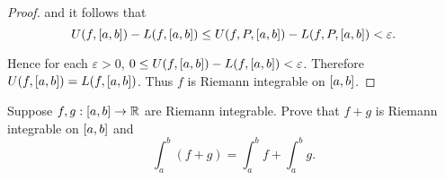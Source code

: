 \begin{proof}
    and it follows that
    \[
        U(f, \left[{a, b}\right]) - L(f, \left[{a, b}\right]) \leq U(f, P, \left[{a, b}\right]) - L(f, P, \left[{a, b}\right]) < \varepsilon.
    \]

    Hence for each $\varepsilon > 0$, $0\leq U(f, \left[{a, b}\right]) - L(f, \left[{a, b}\right]) < \varepsilon$. Therefore $U(f, \left[{a, b}\right]) = L(f, \left[{a, b}\right])$. Thus $f$ is Riemann integrable on $\left[{a, b}\right]$.
\end{proof}
\newpage

\begin{exercise}\label{chapter1:sectionA:exercise4}
    Suppose $f, g: \left[{a, b}\right]\to\mathbb{R}$ are Riemann integrable. Prove that $f + g$ is Riemann integrable on $\left[{a, b}\right]$ and
    \[
        \int^{b}_{a}(f + g) = \int^{b}_{a}f + \int^{b}_{a}g.
    \]
\end{exercise}

